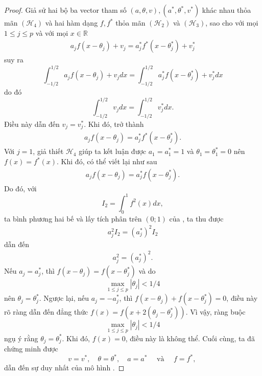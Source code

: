 \begin{proof}
    Giả sử hai bộ ba vector tham số $(a, \theta, v), \left(a^{*}, \theta^{*}, v^{*}\right)$ khác nhau thỏa mãn $\left(\mathcal{H}_{4}\right)$ và hai hàm dạng $f, f^{*}$ thỏa mãn $\left(\mathcal{H}_{2}\right)$ và $\left(\mathcal{H}_{3}\right)$, sao cho với mọi $1 \leq j \leq p$ và với mọi $x \in \mathbb{R}$
\begin{align}
    a_{j} f\left(x-\theta_{j}\right)+v_{j}=a_{j}^{*} f^{*}\left(x-\theta_{j}^{*}\right)+v_{j}^{*}
    \label{10.1}
\end{align}
suy ra
$$
\int_{-1 / 2}^{1 / 2} a_j f\left(x-\theta_j\right)+v_j d x=\int_{-1 / 2}^{1 / 2} a_j^* f\left(x-\theta_j^*\right)+v_j^* d x
$$
do đó
$$
\int_{-1 / 2}^{1 / 2} v_j d x=\int_{-1 / 2}^{1 / 2} v_j^* d x.
$$
Điều này dẫn đến $v_{j}=v_{j}^{*}$. Khi đó,  trở thành
\begin{align}
    a_{j} f\left(x-\theta_{j}\right)=a_{j}^{*} f^{*}\left(x-\theta_{j}^{*}\right) .
    \label{10.2}
\end{align}
Với $j=1$, giả thiết $\mathcal{H}_4$ giúp ta kết luận được $a_{1}=a_{1}^{*}=1$ và $\theta_{1}=\theta_{1}^{*}=0$ nên $f(x)=f^{*}(x)$. Khi đó,  có thể viết lại như sau
\begin{align}
    a_{j} f\left(x-\theta_{j}\right)=a_{j}^{*} f\left(x-\theta_{j}^{*}\right) .
    \label{10.3}
\end{align}
Do đó, với
$$
I_{2}=\int_{0}^{1} f^{2}(x) d x,
$$
ta bình phương hai bế và lấy tích phân trên $\left(0;1\right)$ của , ta thu được
\begin{align}
    a_{j}^{2} I_{2}=\left(a_{j}^{*}\right)^{2} I_{2}
    \label{10.4}
\end{align}
dẫn đến
\begin{align}
    a_{j}^{2}=\left(a_{j}^{*}\right)^{2}.
    \label{10.5}
\end{align}
Nếu $a_{j}=a_{j}^{*}$, thì $f\left(x-\theta_{j}\right)=f\left(x-\theta_{j}^{*}\right)$ và do
$$
\max _{1 \leq j \leq p}\left|\theta_{j}\right|<1 / 4
$$
nên $\theta_{j}=\theta_{j}^{*}$. Ngược lại, nếu $a_{j}=-a_{j}^{*}$, thì $f\left(x-\theta_{j}\right)+f\left(x-\theta_{j}^{*}\right)=0$, điều này rõ ràng dẫn đến đẳng thức $f(x)=f\left(x+2\left(\theta_{j}-\theta_{j}^{*}\right)\right)$. Vì vậy, ràng buộc
$$
\max _{1 \leq j \leq p}\left|\theta_{j}\right|<1 / 4
$$
ngụ ý rằng $\theta_{j}=\theta_{j}^{*}$. Khi đó, $f(x)=0$, điều này là không thể. Cuối cùng, ta đã chứng minh được
$$
v=v^{*}, \quad \theta=\theta^{*}, \quad a=a^{*} \quad \text { và } \quad f=f^{*} \text {, }
$$
dẫn đến sự duy nhất của mô hình . 
\end{proof}




